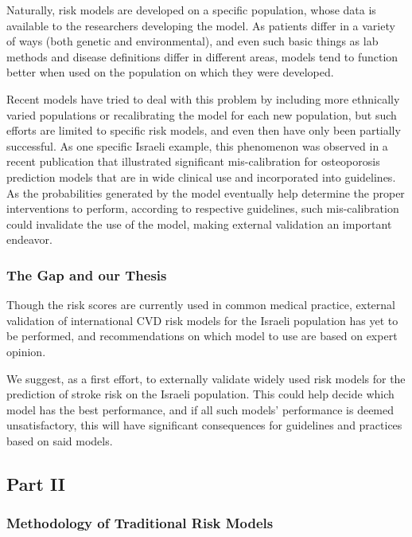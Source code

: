 \documentclass[a4paper,12pt]{article}
\begin{document}
			Naturally, risk models are developed on a specific population, whose data is available to the researchers developing the model. As patients differ in a variety of ways (both genetic and environmental), and even such basic things as lab methods and disease definitions differ in different areas, models tend to function better when used on the population on which they were developed\cite{DAgostino2001,Bastuji-Garin2002}.
			
			Recent models have tried to deal with this problem by including more ethnically varied populations\cite{DeFilippis2015} or recalibrating the model for each new population\cite{Kanis2008}, but such efforts are limited to specific risk models, and even then have only been partially successful\cite{Dagan2017}. As one specific Israeli example, this phenomenon was observed in a recent publication that illustrated significant mis-calibration for osteoporosis prediction models that are in wide clinical use and incorporated into guidelines\cite{Dagan2017}. As the probabilities generated by the model eventually help determine the proper interventions to perform, according to respective guidelines, such mis-calibration could invalidate the use of the model, making external validation an important endeavor\cite{Moons2012}.
			
			\subsubsection{The Gap and our Thesis}
		
			Though the risk scores are currently used in common medical practice, external validation of international CVD risk models for the Israeli population has yet to be performed, and recommendations on which model to use are based on expert opinion\cite{Bitzur2015}.
			
			We suggest, as a first effort, to externally validate widely used risk models for the prediction of stroke risk on the Israeli population. This could help decide which model has the best performance, and if all such models' performance is deemed unsatisfactory, this will have significant consequences for guidelines and practices based on said models.
		
		\subsection{Part II}
		
			\subsubsection{Methodology of Traditional Risk Models}
		
\end{document}
